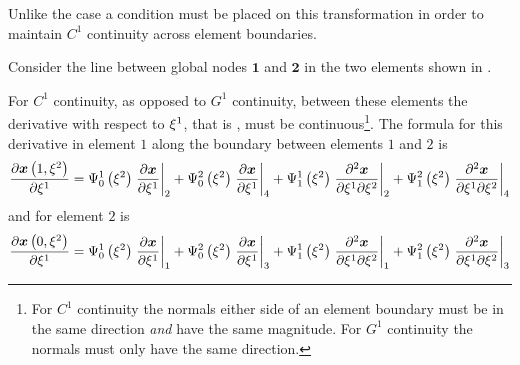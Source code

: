 Unlike the \onedal \cubicherm case a condition must be placed on
this transformation in order to maintain $C^{1}$ continuity across element
boundaries. 

Consider the line between global nodes $\mathbf{1}$ and $\mathbf{2}$ in the
two \bicubicherm elements shown in .

For $C^{1}$ continuity, as opposed to $G^{1}$ continuity, between these
elements the derivative with respect to $\xi^{1}$, that is
, must be continuous\footnote{For
  $C^{1}$ continuity the normals either side of an element boundary must be in
  the same direction \emph{and} have the same magnitude. For $G^{1}$
  continuity the normals must only have the same direction.}. The formula for
this derivative in element $\mathit{1}$ along the boundary between elements
$\mathit{1}$ and $\mathit{2}$ is
\begin{equation}
  \delby{\fnof{\vect{x}}{1,\xitwo}}{\xione}=\chbfn{0}{1}{\xitwo}\evalat{
    \delby{\vect{x}}{\xione}}{2}+\chbfn{0}{2}{\xitwo}\evalat{
    \delby{\vect{x}}{\xione}}{4}+\chbfn{1}{1}{\xitwo}\evalat{
    \deltwoby{\vect{x}}{\xione}{\xitwo}}{2}+\chbfn{1}{2}{\xitwo}\evalat{
    \deltwoby{\vect{x}}{\xione}{\xitwo}}{4}
  \label{eqn:c1contelem1}
\end{equation}
and for element $\mathit{2}$ is
\begin{equation}
  \delby{\fnof{\vect{x}}{0,\xitwo}}{\xione}=\chbfn{0}{1}{\xitwo}\evalat{
    \delby{\vect{x}}{\xione}}{1}+\chbfn{0}{2}{\xitwo}\evalat{
    \delby{\vect{x}}{\xione}}{3}+\chbfn{1}{1}{\xitwo}\evalat{
    \deltwoby{\vect{x}}{\xione}{\xitwo}}{1}+\chbfn{1}{2}{\xitwo}\evalat{
    \deltwoby{\vect{x}}{\xione}{\xitwo}}{3}
  \label{eqn:c1contelem2}
\end{equation}

